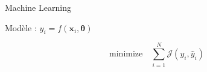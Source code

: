 \documentclass[aspectratio=169]{beamer}
\begin{document}
\begin{frame}[t, c]{Machine Learning}{}
  \vfill
  \begin{minipage}{.48\textwidth}
    \centering

    Modèle : \( y_i = f(\bm{x}_i, \boldsymbol{\theta}) \)

    \[
    \textrm{minimize} \quad \sum_{i=1}^N \mathcal{J}(y_i, \hat{y}_i)
    \]
  \end{minipage}%
  \hfill
  \begin{minipage}{.48\textwidth}
    \centering
  \end{minipage}
  \vfill
\end{frame}

\begin{frame}
\end{frame}
\end{document}
